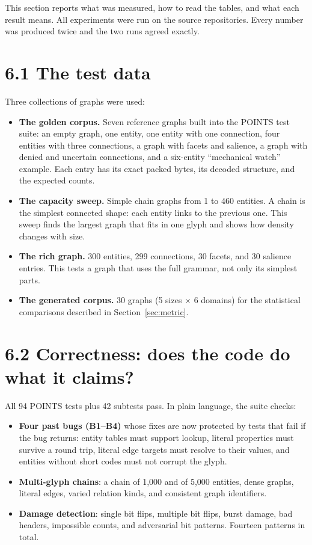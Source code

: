 \label{sec:experiments}

This section reports what was measured, how to read the tables, and what each result means. All experiments were run on the source repositories. Every number was produced twice and the two runs agreed exactly.

\section*{6.1 The test data}

Three collections of graphs were used:

\begin{itemize}
\item \textbf{The golden corpus.} Seven reference graphs built into the POINTS test suite: an empty graph, one entity, one entity with one connection, four entities with three connections, a graph with facets and salience, a graph with denied and uncertain connections, and a six-entity ``mechanical watch'' example. Each entry has its exact packed bytes, its decoded structure, and the expected counts.
\item \textbf{The capacity sweep.} Simple chain graphs from 1 to 460 entities. A chain is the simplest connected shape: each entity links to the previous one. This sweep finds the largest graph that fits in one glyph and shows how density changes with size.
\item \textbf{The rich graph.} 300 entities, 299 connections, 30 facets, and 30 salience entries. This tests a graph that uses the full grammar, not only its simplest parts.
\item \textbf{The generated corpus.} 30 graphs (5 sizes $\times$ 6 domains) for the statistical comparisons described in Section~\ref{sec:metric}.
\end{itemize}

\section*{6.2 Correctness: does the code do what it claims?}

All 94 POINTS tests plus 42 subtests pass. In plain language, the suite checks:

\begin{itemize}
\item \textbf{Four past bugs (B1--B4)} whose fixes are now protected by tests that fail if the bug returns: entity tables must support lookup, literal properties must survive a round trip, literal edge targets must resolve to their values, and entities without short codes must not corrupt the glyph.
\item \textbf{Multi-glyph chains}: a chain of 1,000 and of 5,000 entities, dense graphs, literal edges, varied relation kinds, and consistent graph identifiers.
\item \textbf{Damage detection}: single bit flips, multiple bit flips, burst damage, bad headers, impossible counts, and adversarial bit patterns. Fourteen patterns in total.
\end{itemize}

